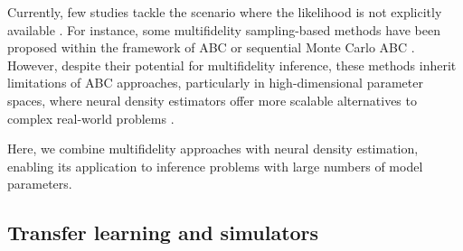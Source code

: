 Currently, few studies tackle the scenario where the likelihood is not explicitly available \cite{warne_multifidelity_2022, prescott_efficient_2024, prescott_multifidelity_2021}. For instance, some multifidelity sampling-based methods have been proposed within the framework of ABC \cite{prescott_multifidelity_2020} or sequential Monte Carlo ABC \cite{prescott_multifidelity_2021}. However, despite their potential for multifidelity inference, these methods inherit limitations of ABC approaches, particularly in high-dimensional parameter spaces, where neural density estimators offer more scalable alternatives to complex real-world problems \cite{lueckmann_benchmarking_2021}.





Here, we combine multifidelity approaches with neural density estimation, enabling its application to inference problems with large numbers of model parameters.

\subsection{Transfer learning and simulators} 

